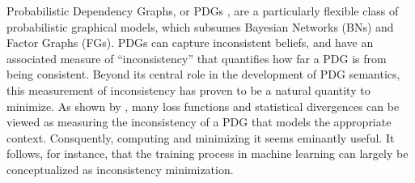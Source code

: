 \documentclass[twoside]{article}
\begin{document}
Probabilistic Dependency Graphs, or PDGs \parencite{pdg-aaai},
are a particularly flexible class of probabilistic graphical models, which subsumes Bayesian Networks (BNs) 
and Factor Graphs (FGs). 
PDGs can capture inconsistent beliefs, and have an associated measure
of ``inconsistency'' that quantifies how far a PDG is from being consistent.  
Beyond its central role in the development of PDG semantics, this measurement of inconsistency has proven to be a natural quantity to minimize.
As shown by \textcite{one-true-loss}, many
    loss functions and statistical divergences 
    can be viewed as measuring the inconsistency
    of a PDG that models the appropriate context.  
Consquently, computing and minimizing it seems eminantly useful.
It follows, for instance, that the training process in machine
learning can largely be conceptualized as inconsistency minimization.  
\end{document}
